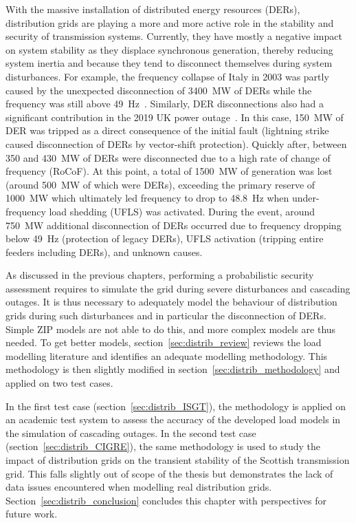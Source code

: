 With the massive installation of distributed energy resources (DERs), distribution grids are playing a more and more active role in the stability and security of transmission systems. Currently, they have mostly a negative impact on system stability as they displace synchronous generation, thereby reducing system inertia and because they tend to disconnect themselves during system disturbances. For example, the frequency collapse of Italy in 2003 was partly caused by the unexpected disconnection of 3400~MW of DERs while the frequency was still above 49~Hz~\cite[p115]{Italy2003}. Similarly, DER disconnections also had a significant contribution in the 2019 UK power outage~\cite{2019UKBlackout}. In this case, 150~MW of DER was tripped as a direct consequence of the initial fault (lightning strike caused disconnection of DERs by vector-shift protection). Quickly after, between 350 and 430~MW of DERs were disconnected due to a high rate of change of frequency (RoCoF). At this point, a total of 1500~MW of generation was lost (around 500~MW of which were DERs), exceeding the primary reserve of 1000~MW which ultimately led frequency to drop to 48.8~Hz when under-frequency load shedding (UFLS) was activated. During the event, around 750~MW additional disconnection of DERs occurred due to frequency dropping below 49~Hz (protection of legacy DERs), UFLS activation (tripping entire feeders including DERs), and unknown causes. %

As discussed in the previous chapters, performing a probabilistic security assessment requires to simulate the grid during severe disturbances and cascading outages. It is thus necessary to adequately model the behaviour of distribution grids during such disturbances and in particular the disconnection of DERs. Simple ZIP models are not able to do this, and more complex models are thus needed. To get better models, section~\ref{sec:distrib_review} reviews the load modelling literature and identifies an adequate modelling methodology. This methodology is then slightly modified in section~\ref{sec:distrib_methodology} and applied on two test cases.

In the first test case (section~\ref{sec:distrib_ISGT}), the methodology is applied on an academic test system to assess the accuracy of the developed load models in the simulation of cascading outages. In the second test case (section~\ref{sec:distrib_CIGRE}), the same methodology is used to study the impact of distribution grids on the transient stability of the Scottish transmission grid. This falls slightly out of scope of the thesis but demonstrates the lack of data issues encountered when modelling real distribution grids. Section~\ref{sec:distrib_conclusion} concludes this chapter with perspectives for future work.


